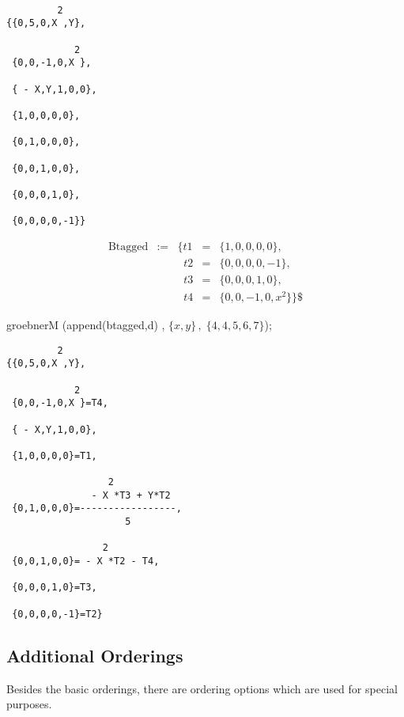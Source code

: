 \begin{verbatim}

         2
{{0,5,0,X ,Y},

            2
 {0,0,-1,0,X },

 { - X,Y,1,0,0},

 {1,0,0,0,0},

 {0,1,0,0,0},

 {0,0,1,0,0},

 {0,0,0,1,0},

 {0,0,0,0,-1}}

\end{verbatim}
\[
\begin{array}{lllll}
\mbox{Btagged} & := & \{t1 & = & \{  1 ,  0  ,  0  ,  0  ,  0 \}, \\
& & \;\; t2 & = & \{  0 ,  0  ,  0  ,  0  , -1 \}, \\
& & \;\; t3 & = & \{  0 ,  0  ,  0  ,  1  ,  0 \}, \\
& & \;\; t4 & = & \{  0 ,  0  , -1  ,  0  , x^2 \}\}\$
\end{array}
\]

\noindent groebnerM (append(btagged,d) , $\{x,y\} \,, \;\{4,4,5,6,7\}$);

\begin{verbatim}
         2
{{0,5,0,X ,Y},

            2
 {0,0,-1,0,X }=T4,

 { - X,Y,1,0,0},

 {1,0,0,0,0}=T1,

                  2
               - X *T3 + Y*T2
 {0,1,0,0,0}=-----------------,
                     5

                 2
 {0,0,1,0,0}= - X *T2 - T4,

 {0,0,0,1,0}=T3,

 {0,0,0,0,-1}=T2}

\end{verbatim}

\subsection{Additional Orderings}
Besides the basic orderings, there are ordering options which are used for
special purposes.
